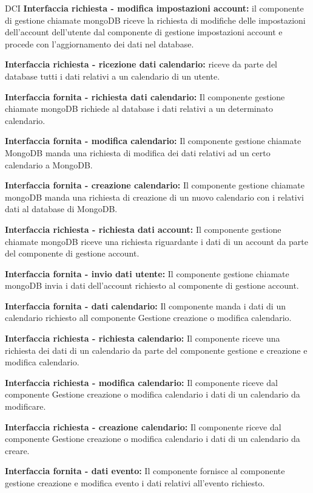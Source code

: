 \begin{listaPersonale}{DCI}
    \textbf{Interfaccia richiesta - modifica impostazioni account:} il componente di gestione chiamate mongoDB riceve la richiesta di modifiche delle impostazioni dell'account dell'utente dal componente di gestione impostazioni account e procede con l'aggiornamento dei dati nel database.

    \textbf{Interfaccia richiesta - ricezione dati calendario:} riceve da parte del database tutti i dati relativi a un calendario di un utente.

    \textbf{Interfaccia fornita - richiesta dati calendario:} Il componente gestione chiamate mongoDB richiede al database i dati relativi a un determinato calendario.

    \textbf{Interfaccia fornita - modifica calendario:} Il componente gestione chiamate MongoDB manda una richiesta di modifica dei dati relativi ad un certo calendario a MongoDB.

    \textbf{Interfaccia fornita - creazione calendario:} Il componente gestione chiamate mongoDB manda una richiesta di creazione di un nuovo calendario con i relativi dati al database di MongoDB.

    \textbf{Interfaccia richiesta - richiesta dati account:} Il componente gestione chiamate mongoDB riceve una richiesta riguardante i dati di un account da parte del componente di gestione account.

    \textbf{Interfaccia fornita - invio dati utente:} Il componente gestione chiamate mongoDB invia i dati dell'account richiesto al componente di gestione account.

    \textbf{Interfaccia fornita - dati calendario:} Il componente manda i dati di un calendario richiesto all componente Gestione creazione o modifica calendario.

    \textbf{Interfaccia richiesta - richiesta calendario:} Il componente riceve una richiesta dei dati di un calendario da parte del componente gestione e creazione e modifica calendario.

    \textbf{Interfaccia richiesta - modifica calendario:} Il componente riceve dal componente Gestione creazione o modifica calendario i dati di un calendario da modificare.

    \textbf{Interfaccia richiesta  - creazione calendario:} Il componente riceve dal componente Gestione creazione o modifica calendario i dati di un calendario da creare.

    \textbf{Interfaccia fornita - dati evento:} Il componente fornisce al componente gestione creazione e modifica evento i dati relativi all'evento richiesto.


\end{listaPersonale}
